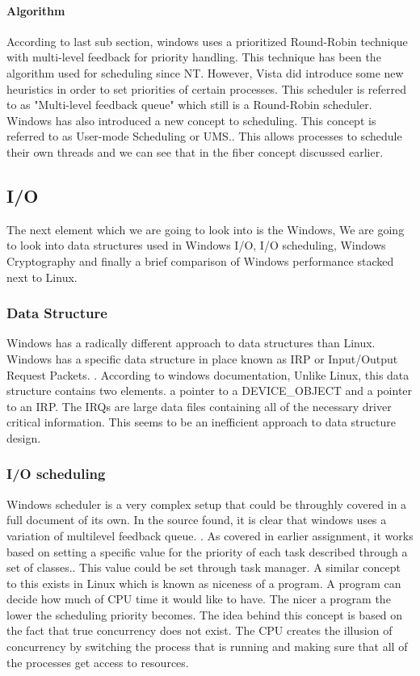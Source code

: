 \documentclass[journal,10pt,onecolumn,compsoc,letterpaper,draftclsnofoot,table,xcdraw]{IEEEtran} \usepackage[margin=0.75in]{geometry}
\begin{document}
\paragraph{Algorithm} According to last sub section, windows uses a prioritized Round-Robin technique with multi-level feedback for priority handling. This technique has been the algorithm used for scheduling since NT. However, Vista did introduce some new heuristics in order to set priorities of certain processes. This scheduler is referred to as "Multi-level feedback queue" which still is a Round-Robin scheduler. Windows has also introduced a new concept to scheduling. This concept is referred to as User-mode Scheduling or UMS.\cite{windowscpuscheduling}. This allows processes to schedule their own threads and we can see that in the fiber concept discussed earlier.

\subsection{I/O}
\noindent The next element which we are going to look into is the Windows, We are going to look into data structures used in Windows I/O, I/O scheduling, Windows Cryptography and finally a brief comparison of Windows performance stacked next to Linux.
\subsubsection{Data Structure}
\noindent Windows has a radically different approach to data structures than Linux. Windows has a specific data structure in place known as IRP or Input/Output Request Packets. \cite{7}. According to windows documentation, Unlike Linux, this data structure contains two elements. a pointer to a DEVICE\_OBJECT and a pointer to an IRP. The IRQs are large data files containing all of the necessary driver critical information. This seems to be an inefficient approach to data structure design.
\subsubsection{I/O scheduling}
\noindent Windows scheduler is a very complex setup that could be throughly covered in a full document of its own. In the source found, it is clear that windows uses a variation of multilevel feedback queue. \cite{8}. As covered in earlier assignment, it works based on setting a specific value for the priority of each task described through a set of classes.\cite{9}. This value could be set through task manager. A similar concept to this exists in Linux which is known as niceness of a program. A program can decide how much of CPU time it would like to have. The nicer a program the lower the scheduling priority becomes. The idea behind this concept is based on the fact that true concurrency does not exist. The CPU creates the illusion of concurrency by switching the process that is running and making sure that all of the processes get access to resources.
\end{document}
